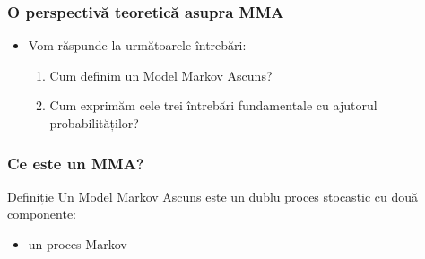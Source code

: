 

\begin{frame}
  \frametitle{O perspectivă teoretică asupra MMA}
  \begin{itemize}
  \item Vom răspunde la următoarele întrebări:
    \begin{enumerate}
      \vspace*{1em}
    \item Cum definim un Model Markov Ascuns?
      \vspace*{1em}
    \item Cum exprimăm cele trei întrebări fundamentale cu ajutorul probabilităților?
    \end{enumerate}
  \end{itemize}
\end{frame}

\begin{frame}
  \frametitle{Ce este un MMA?}
  \begin{block}{Definiție}
    Un \alert{Model Markov Ascuns} este un dublu proces stocastic cu două componente:
    \begin{itemize}
    \item un proces Markov 
    \end{itemize}
  \end{block}
  \vspace*{1em}
\end{frame}


